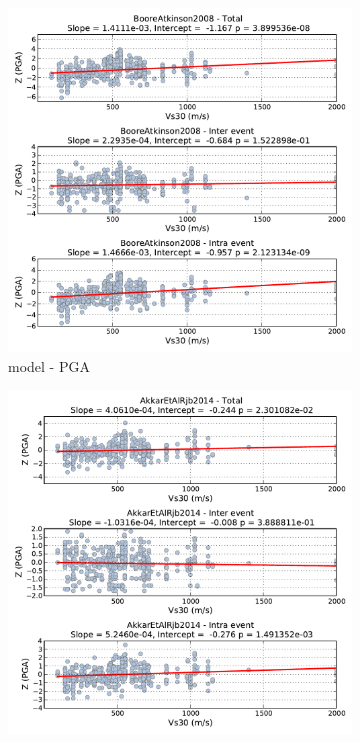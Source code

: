 \begin{figure}[htb]
  \centering
  \begin{subfigure}[b]{0.49\textwidth}
      \includegraphics[width=\textwidth]{./figures/residuals/BA2008_Vs30_PGA.pdf}
      \caption{\cite{boore2008} model - PGA}
      \label{fig:pga_vs30_ba2008}
  \end{subfigure}
    \begin{subfigure}[b]{0.49\textwidth}
      \includegraphics[width=\textwidth]{./figures/residuals/Akkar2014_Vs30_PGA.pdf}

\end{subfigure}
\end{figure}
